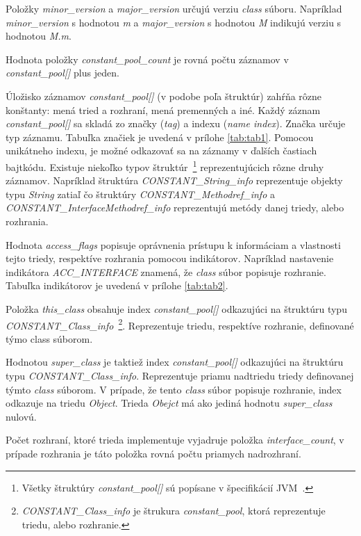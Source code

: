 \documentclass[11pt,final,oneside]{fithesis}
\begin{document}
Položky \textit{minor\_version} a \textit{major\_version}
určujú verziu \textit{class} súboru. Napríklad \textit{minor\_version} s
hodnotou \textit{m} a \textit{major\_version} s hodnotou \textit{M} indikujú
verziu s hodnotou \textit{M.m}.

Hodnota položky \textit{constant\_pool\_count} je rovná počtu záznamov
v \textit{constant\_pool[]} plus jeden.

Úložisko záznamov \textit{constant\_pool[]} (v podobe poľa štruktúr)
zahŕňa rôzne konštanty: mená tried a rozhraní, mená premenných a iné. Každý
záznam \textit{constant\_pool[]} sa skladá zo značky (\textit{tag}) a indexu
(\textit{name index}). Značka určuje typ záznamu. Tabuľka značiek je uvedená
v prílohe \ref{tab:tab1}. Pomocou unikátneho indexu, je možné odkazovať sa na
záznamy v ďalších častiach bajtkódu. Existuje niekoľko typov
štruktúr~\footnote {Všetky štruktúry \textit{constant\_pool[]} sú popísane v
špecifikácií JVM~\cite{Lindholm:2013:JVM:2462629}.} reprezentujúcich rôzne
druhy záznamov. Napríklad štruktúra \textit{CONSTANT\_String\_info}
reprezentuje objekty typu \textit{String} zatiaľ čo štruktúry
\textit{CONSTANT\_Methodref\_info} a \textit
{CONSTANT\_InterfaceMethodref\_info} reprezentujú metódy danej triedy, alebo
rozhrania.

Hodnota \textit{access\_flags} popisuje oprávnenia prístupu k
informáciam a vlastnosti tejto triedy, respektíve rozhrania pomocou
indikátorov. Napríklad nastavenie indikátora \textit{ACC\_INTERFACE} znamená,
že \textit{class} súbor popisuje rozhranie. Tabuľka indikátorov je uvedená v
prílohe \ref{tab:tab2}.

Položka \textit{this\_class} obsahuje index \textit{constant\_pool[]}
odkazujúci na štruktúru typu \textit{CONSTANT\_Class\_info}~\footnote
{\textit{CONSTANT\_Class\_info} je štrukura \textit{constant\_pool}, ktorá
reprezentuje triedu, alebo rozhranie.}. Reprezentuje triedu, respektíve
rozhranie, definované týmo class súborom.

Hodnotou \textit{super\_class} je taktiež index \textit{constant\_pool[]}
odkazujúci na štruktúru typu \textit{CONSTANT\_Class\_info}. Reprezentuje
priamu nadtriedu triedy definovanej týmto \textit{class} súborom. V prípade,
že tento \textit{class} súbor popisuje rozhranie, index odkazuje na triedu
\textit{Object}. Trieda \textit{Obejct} má ako jediná hodnotu
\textit{super\_class} nulovú.

Počet rozhraní, ktoré trieda implementuje vyjadruje položka
\textit{interface\_count}, v prípade rozhrania je táto položka rovná počtu
priamych nadrozhraní.
\end{document}
